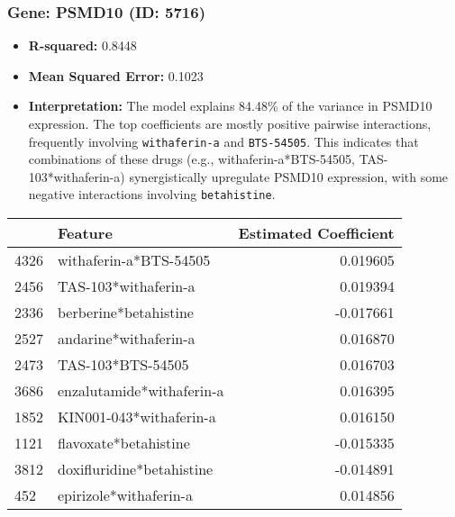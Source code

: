 \documentclass[12pt]{article}
\begin{document}
\subsubsection{Gene: PSMD10 (ID: 5716)}
\begin{itemize}
    \item \textbf{R-squared:} 0.8448
    \item \textbf{Mean Squared Error:} 0.1023
    \item \textbf{Interpretation:} The model explains 84.48\% of the variance in PSMD10 expression. The top coefficients are mostly positive pairwise interactions, frequently involving \texttt{withaferin-a} and \texttt{BTS-54505}. This indicates that combinations of these drugs (e.g., withaferin-a*BTS-54505, TAS-103*withaferin-a) synergistically upregulate PSMD10 expression, with some negative interactions involving \texttt{betahistine}.
\end{itemize}
\begin{tabularx}{\textwidth}{l X r}
\toprule
{} & Feature & Estimated Coefficient \\
\midrule
4326 & withaferin-a*BTS-54505 & 0.019605 \\
2456 & TAS-103*withaferin-a & 0.019394 \\
2336 & berberine*betahistine & -0.017661 \\
2527 & andarine*withaferin-a & 0.016870 \\
2473 & TAS-103*BTS-54505 & 0.016703 \\
3686 & enzalutamide*withaferin-a & 0.016395 \\
1852 & KIN001-043*withaferin-a & 0.016150 \\
1121 & flavoxate*betahistine & -0.015335 \\
3812 & doxifluridine*betahistine & -0.014891 \\
452 & epirizole*withaferin-a & 0.014856 \\
\bottomrule
\end{tabularx}
\end{document}

